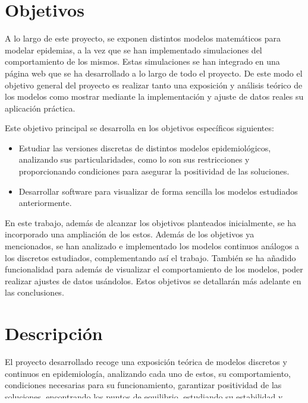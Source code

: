 \section*{Objetivos}

A lo largo de este proyecto, se exponen distintos modelos matemáticos para modelar epidemias, a la vez que se han implementado simulaciones del comportamiento de los mismos. Estas simulaciones se han integrado en una página web que se ha desarrollado a lo largo de todo el proyecto. De este modo el objetivo general del proyecto es realizar tanto una exposición y análisis teórico de los modelos como mostrar mediante la implementación y ajuste de datos reales su aplicación práctica.

Este objetivo principal se desarrolla en los objetivos específicos siguientes:

\begin{itemize}
\item Estudiar las versiones discretas de distintos modelos epidemiológicos, analizando sus particularidades, como lo son sus restricciones y proporcionando condiciones para asegurar la positividad de las soluciones.
\item Desarrollar software para visualizar de forma sencilla los modelos estudiados anteriormente.
\end{itemize}

En este trabajo, además de alcanzar los objetivos planteados inicialmente, se ha incorporado una ampliación de los estos. Además de los objetivos ya mencionados, se han analizado e implementado los modelos continuos análogos a los discretos estudiados, complementando así el trabajo. También se ha añadido funcionalidad para además de visualizar el comportamiento de los modelos, poder realizar ajustes de datos usándolos. Estos objetivos se detallarán más adelante en las conclusiones.


\section*{Descripción}

El proyecto desarrollado recoge una exposición teórica de modelos discretos y continuos en epidemiología, analizando cada uno de estos, su comportamiento, condiciones necesarias para su funcionamiento, garantizar positividad de las soluciones, encontrando los puntos de equilibrio, estudiando su estabilidad y presentando conceptos relevantes en epidemiología como el número reproductivo base.

